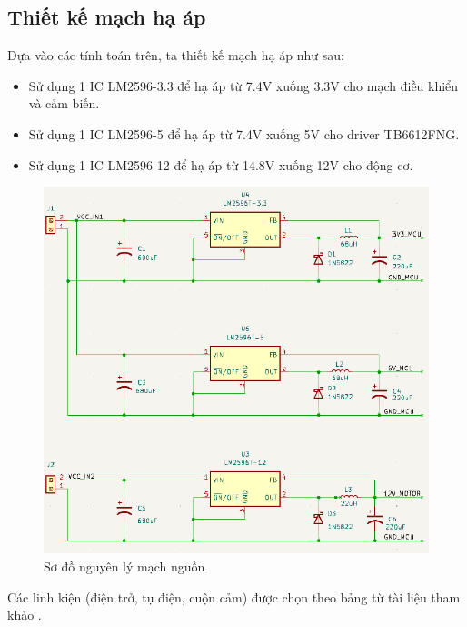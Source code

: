             \subsection{Thiết kế mạch hạ áp}
                \hspace*{0.6cm}Dựa vào các tính toán trên, ta thiết kế mạch hạ áp như sau:
                \begin{itemize}
                    \item Sử dụng 1 IC LM2596-3.3 để hạ áp từ 7.4V xuống 3.3V cho mạch điều khiển và cảm biến.
                    \item Sử dụng 1 IC LM2596-5 để hạ áp từ 7.4V xuống 5V cho driver TB6612FNG.
                    \item Sử dụng 1 IC LM2596-12 để hạ áp từ 14.8V xuống 12V cho động cơ.
                \end{itemize}
                \begin{figure}[H]
                    \centering
                    \includegraphics[width=1\textwidth]{pictures/chapter4/c4_p16_PowerSchematic.png}
                    \caption{Sơ đồ nguyên lý mạch nguồn}
                    \label{fig:4-9}
                \end{figure}
                \hspace*{0.6cm}Các linh kiện (điện trở, tụ điện, cuộn cảm) được chọn theo bảng từ tài liệu tham khảo \cite{lm2596}.

